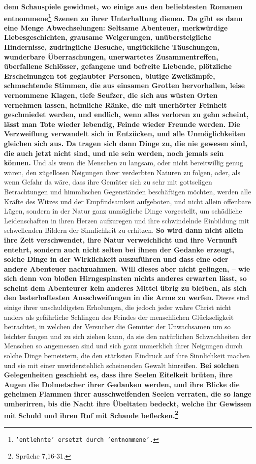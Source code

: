 \textbf{dem Schauspiele
gewidmet, wo einige aus den beliebtesten Romanen
entnommene\footnote{\texttt{'entlehnte' ersetzt durch 'entnommene'.}} Szenen zu
ihrer
Unterhaltung dienen. Da gibt es dann eine Menge Abwechselungen: Seltsame
Abenteuer, merkwürdige Liebesgeschichten, grausame Weigerungen,
unübersteigliche Hindernisse, zudringliche Besuche, unglückliche Täuschungen,
wunderbare Überraschungen, unerwartetes Zusammentreffen, überfallene Schlösser,
gefangene und befreite Liebende, plötzliche Erscheinungen tot geglaubter
Personen, blutige Zweikämpfe, schmachtende Stimmen, die aus einsamen Grotten
hervorhallen, leise vernommene Klagen, tiefe Seufzer, die sich aus wüsten
Orten vernehmen lassen, heimliche Ränke, die mit unerhörter Feinheit
geschmiedet werden, und endlich, wenn alles verloren zu gehn scheint, lässt man
Tote wieder lebendig, Feinde wieder Freunde werden. Die Verzweiflung verwandelt
sich in Entzücken, und alle Unmöglichkeiten gleichen sich aus. Da tragen sich
dann Dinge zu, die nie gewesen sind, die auch jetzt nicht sind, und nie sein
werden, noch jemals sein können.} Und als wenn die Menschen zu langsam, oder
nicht bereitwillig genug wären, den zügellosen Neigungen ihrer verderbten
Naturen zu folgen, oder, als wenn Gefahr da wäre, dass ihre Gemüter sich zu sehr
mit gottseligen Betrachtungen und himmlischen Gegenständen beschäftigen möchten,
werden alle Kräfte des Witzes und der Empfindsamkeit aufgeboten, und nicht
allein
offenbare Lügen, sondern in der Natur ganz unmögliche Dinge vorgestellt, um
schädliche Leidenschaften in ihren Herzen aufzuregen und ihre schwindelnde
Einbildung mit schwellenden Bildern der Sinnlichkeit zu erhitzen.
\label{ref:17_01_schauspiel_2}
\textbf{So wird dann
nicht allein ihre Zeit verschwendet, ihre Natur verweichlicht und ihre Vernunft
entehrt, sondern auch nicht selten bei ihnen der Gedanke erzeugt, solche Dinge
in der Wirklichkeit auszuführen und dass eine oder andere Abenteuer nachzuahmen.
Will dieses aber nicht gelingen, -- wie sich denn von bloßen Hirngespinsten
nichts anderes erwarten lässt, so scheint dem Abenteurer kein anderes Mittel
übrig
zu bleiben, als sich den lasterhaftesten Ausschweifungen in die Arme zu werfen.}
Dieses sind einige ihrer unschuldigsten Erholungen, die jedoch jeder wahre
Christ nicht anders als gefährliche Schlingen des Feindes der menschlichen
Glückseligkeit betrachtet, in welchen der Versucher die Gemüter der Unwachsamen
um so leichter fangen und zu sich ziehen kann, da sie den natürlichen
Schwachheiten der Menschen so angemessen sind und sich ganz unmerklich ihrer
Neigungen durch solche Dinge bemeistern, die den stärksten Eindruck auf ihre
Sinnlichkeit machen und sie mit einer unwiderstehlich scheinenden Gewalt
hinreißen. \textbf{Bei solchen Gelegenheiten geschieht es, dass ihre Seelen
Eitelkeit
brüten, ihre Augen die Dolmetscher ihrer Gedanken werden, und ihre Blicke die
geheimen Flammen ihrer ausschweifenden Seelen verraten, die so lange
umherirren, bis die Nacht ihre Übeltaten bedeckt, welche ihr Gewissen mit
Schuld und ihren Ruf mit Schande beflecken.\footnote{Sprüche 7,16-31.}}

